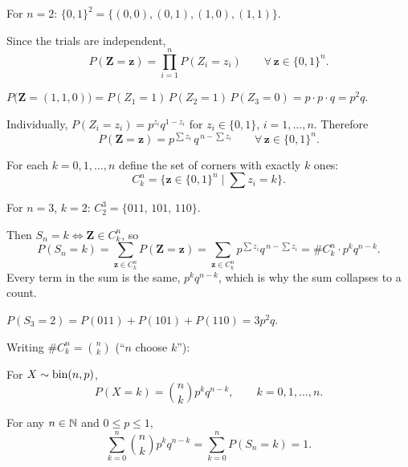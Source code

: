 \begin{example}
For $n = 2$: $\{0,1\}^2 = \{(0,0),(0,1),(1,0),(1,1)\}$.
\end{example}

Since the trials are independent,
\[
P(\mathbf{Z} = \mathbf{z}) = \prod_{i=1}^{n} P(Z_i = z_i) \qquad \forall\, \mathbf{z} \in \{0,1\}^n.
\]

\begin{example}
$P\big(\mathbf{Z} = (1,1,0)\big) = P(Z_1 = 1)\,P(Z_2 = 1)\,P(Z_3 = 0) = p \cdot p \cdot q = p^2 q.$
\end{example}

Individually, $P(Z_i = z_i) = p^{z_i} q^{1-z_i}$ for $z_i \in \{0,1\}$, $i = 1,\dots,n$. Therefore
\[
P(\mathbf{Z} = \mathbf{z}) = p^{\sum z_i}\, q^{\,n - \sum z_i} \qquad \forall\, \mathbf{z} \in \{0,1\}^n.
\]

For each $k = 0,1,\dots,n$ define the set of corners with exactly $k$ ones:
\[
C_k^n = \Big\{ \mathbf{z} \in \{0,1\}^n \;\Big|\; \textstyle\sum z_i = k \Big\}.
\]

\begin{example}
For $n = 3$, $k = 2$: $C_2^3 = \{011,\,101,\,110\}$.
\end{example}

Then $S_n = k \iff \mathbf{Z} \in C_k^n$, so
\[
P(S_n = k) = \sum_{\mathbf{z} \in C_k^n} P(\mathbf{Z} = \mathbf{z})
= \sum_{\mathbf{z} \in C_k^n} p^{\sum z_i} q^{\,n-\sum z_i}
= \#C_k^n \cdot p^k q^{n-k}.
\]
Every term in the sum is the same, $p^k q^{n-k}$, which is why the sum collapses to a count.

\begin{example}
$P(S_3 = 2) = P(011) + P(101) + P(110) = 3p^2 q$.
\end{example}

Writing $\#C_k^n = \binom{n}{k}$ (``$n$ choose $k$''):

\begin{definition}
For $X \sim \operatorname{bin}(n,p)$,
\[
P(X = k) = \binom{n}{k} p^k q^{n-k}, \qquad k = 0,1,\dots,n.
\]
\end{definition}

\begin{corollary}
For any $n \in \mathbb{N}$ and $0 \le p \le 1$,
\[
\sum_{k=0}^{n} \binom{n}{k} p^k q^{n-k} = \sum_{k=0}^{n} P(S_n = k) = 1.
\]
\end{corollary}

